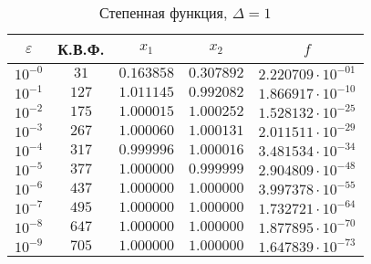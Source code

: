 \documentclass[a4paper,12pt,notitlepage,pdftex,headsepline]{scrartcl}
\begin{document}
        \begin{table}[ht]
          \centering
          \caption{Степенная функция, $\Delta = 1$}
          \begin{tabular}{|c|c|c|c|c|}
            \hline
            $\varepsilon$ & К.В.Ф. & $x_1$ & $x_2$ & $f$\\
            \hline
            $10^{-0}$ & $31$ & $0.163858$ & $0.307892$ & $2.220709\cdot 10^{-01}$\\
            $10^{-1}$ & $127$ & $1.011145$ & $0.992082$ & $1.866917\cdot 10^{-10}$\\
            $10^{-2}$ & $175$ & $1.000015$ & $1.000252$ & $1.528132\cdot 10^{-25}$\\
            $10^{-3}$ & $267$ & $1.000060$ & $1.000131$ & $2.011511\cdot 10^{-29}$\\
            $10^{-4}$ & $317$ & $0.999996$ & $1.000016$ & $3.481534\cdot 10^{-34}$\\
            $10^{-5}$ & $377$ & $1.000000$ & $0.999999$ & $2.904809\cdot 10^{-48}$\\
            $10^{-6}$ & $437$ & $1.000000$ & $1.000000$ & $3.997378\cdot 10^{-55}$\\
            $10^{-7}$ & $495$ & $1.000000$ & $1.000000$ & $1.732721\cdot 10^{-64}$\\
            $10^{-8}$ & $647$ & $1.000000$ & $1.000000$ & $1.877895\cdot 10^{-70}$\\
            $10^{-9}$ & $705$ & $1.000000$ & $1.000000$ & $1.647839\cdot 10^{-73}$\\
            \hline
          \end{tabular}
        \end{table}
\end{document}
